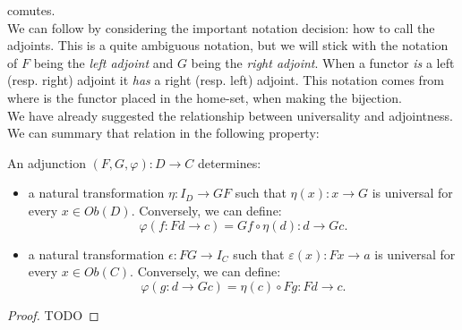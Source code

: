 comutes. \\

We can follow by considering the important notation decision: how to call the adjoints. This is a quite ambiguous notation, but we will stick with the notation of $F$ being the \emph{left adjoint} and $G$ being the \emph{right adjoint}. When a functor \emph{is} a left (resp. right) adjoint it \emph{has} a right (resp. left) adjoint. This notation comes from where is the functor placed in the home-set, when making the bijection.\\

We have already suggested the relationship between universality and adjointness. We can summary that relation in the following property:
\begin{proposition}
  An adjunction $(F,G,\varphi): D\to C $ determines:
  \begin{itemize}
  \item a natural transformation $\eta: I_D \to GF$ such that $\eta(x):x\to G$ is universal for every $x\in Ob(D)$. Conversely, we can define:
    $$\varphi(f:Fd\to c) = Gf\circ \eta(d): d\to G c.$$
  \item a natural transformation $\epsilon: FG\to I_C$ such that $\varepsilon(x):Fx\to a$ is universal for every $x\in Ob(C)$. Conversely, we can define:
    $$\varphi(g:d\to Gc) = \eta(c)\circ Fg: Fd\to c.$$
  \end{itemize}
\end{proposition}
\begin{proof}
  {\color{red} TODO}
\end{proof}



